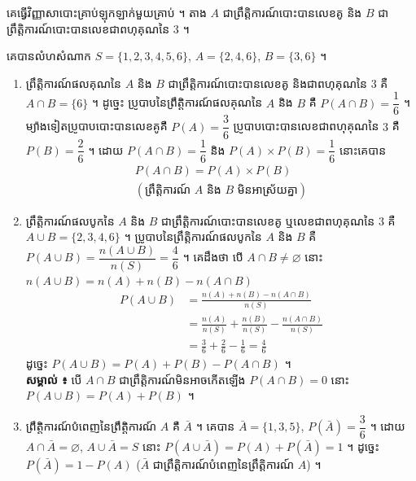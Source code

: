 \begin{example}[ឧទាហរណ៍]
គេធ្វើវិញ្ញាសាបោះគ្រាប់ឡុកឡាក់មួយគ្រាប់ ។ តាង $A$ ជាព្រឹត្តិការណ៍បោះបានលេខគូ និង $B$ ជាព្រឹត្តិការណ៍បោះបានលេខជាពហុគុណនៃ $3$ ។
\end{example}
គេបានលំហសំណាក $S = \{1, 2, 3, 4, 5, 6\}$, $A = \{2, 4, 6\}$, $B = \{3, 6\}$ ។
\begin{enumerate}[a]
  \item ព្រឹត្តិការណ៍ផលគុណនៃ $A$ និង $B$ ជាព្រឹត្តិការណ៍បោះបានលេខគូ និងជាពហុគុណនៃ $3$ គឺ $A \cap B = \{6\}$ ។ ដូច្នេះ ប្រូបាបនៃព្រឹត្តិការណ៍ផលគុណនៃ $A$ និង $B$ គឺ $P(A \cap B) = \dfrac{1}{6}$ ។ ម្យ៉ាងទៀតប្រូបាបបោះបានលេខគូគឺ $P(A) = \dfrac{3}{6}$ ប្រូបាបបោះបានលេខជាពហុគុណនៃ $3$ គឺ $P(B) = \dfrac{2}{6}$ ។ ដោយ $P(A \cap B) = \dfrac{1}{6}$ និង $P(A)\times P(B) = \dfrac{1}{6}$ នោះគេបាន
  \[
\begin{gathered}
P(A \cap B) = P(A)\times P(B)\\
(\text{ព្រឹត្តិការណ៍ } A \text{ និង } B \text{ មិនអាស្រ័យគ្នា})
\end{gathered}
\]
  \item ព្រឹត្តិការណ៍ផលបូកនៃ $A$ និង $B$ ជាព្រឹត្តិការណ៍បោះបានលេខគូ ឬលេខជាពហុគុណនៃ $3$ គឺ $A \cup B = \{2, 3, 4, 6\}$ ។ ប្រូបាបនៃព្រឹត្តិការណ៍ផលបូកនៃ $A$ និង $B$ គឺ $P(A \cup B) = \dfrac{n(A \cup B)}{n(S)} = \dfrac{4}{6}$ ។ គេដឹងថា បើ $A \cap B \ne \varnothing$ នោះ $n(A \cup B) = n(A) + n(B) - n(A \cap B)$
  \[
  \begin{aligned}
P(A \cup B) &= \frac{n(A) + n(B) - n(A \cap B)}{n(S)}\\
&= \frac{n(A)}{n(S)} + \frac{n(B)}{n(S)} - \frac{n(A \cap B)}{n(S)}\\
&= \frac{3}{6} + \frac{2}{6} - \frac{1}{6} = \frac{4}{6}
\end{aligned}
  \]
  ដូច្នេះ $P(A \cup B) = P(A) + P(B) - P(A \cap B)$ ។\\
  \textbf{សម្គាល់ ៖} បើ $A \cap B$ ជាព្រឹត្តិការណ៍មិនអាចកើតឡើង $P(A \cap B) = 0$ នោះ $P(A \cup B) = P(A) + P(B)$ ។
  \item ព្រឹត្តិការណ៍បំពេញនៃព្រឹត្តិការណ៍ $A$ គឺ $\bar{A}$ ។ គេបាន $\bar{A} = \{1, 3, 5\}$, $P(\bar{A}) = \dfrac{3}{6}$ ។ ដោយ $A \cap \bar{A} = \varnothing$, $A \cup \bar{A} = S$ នោះ $P(A \cup \bar{A}) = P(A) + P(\bar{A}) = 1$ ។ ដូច្នេះ $P(\bar{A}) = 1 - P(A)$ ($\bar{A}$ ជាព្រឹត្តិការណ៍បំពេញនៃព្រឹត្តិការណ៍ $A$) ។
\end{enumerate}

